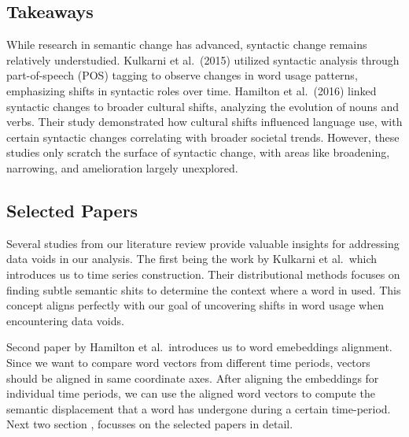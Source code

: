 \subsection{Takeaways}\label{subsec:takeaways3}
While research in semantic change has advanced, syntactic change remains relatively understudied.
Kulkarni et al.\ (2015) utilized syntactic analysis through part-of-speech (POS) tagging to observe changes in word usage patterns, emphasizing shifts in syntactic roles over time.
Hamilton et al.\ (2016) linked syntactic changes to broader cultural shifts, analyzing the evolution of nouns and verbs.
Their study demonstrated how cultural shifts influenced language use, with certain syntactic changes correlating with broader societal trends.
However, these studies only scratch the surface of syntactic change, with areas like broadening, narrowing, and amelioration largely unexplored.

\subsection{Selected Papers}\label{subsec:selected-papers}
Several studies from our literature review provide valuable insights for addressing data voids in our analysis.
The first being the work by Kulkarni et al.\ which introduces us to time series construction.
Their distributional methods focuses on finding subtle semantic shits to determine the context where a word in used.
This concept aligns perfectly with our goal of uncovering shifts in word usage when encountering data voids.

Second paper by Hamilton et al.\ introduces us to word emebeddings alignment.
Since we want to compare word vectors from different time periods, vectors should be aligned in same coordinate axes.
After aligning the embeddings for individual time periods, we can use the aligned word vectors to compute the semantic displacement that a word has undergone during a certain time-period.
Next two section ,  focusses on the selected papers in detail.